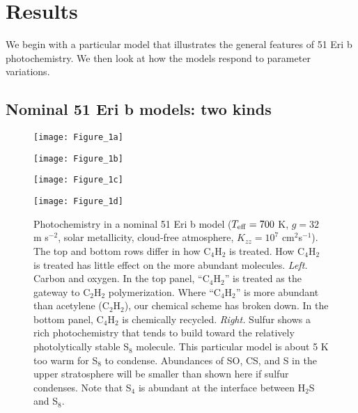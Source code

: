 \documentclass[preprint]{aastex}
\begin{document}
\section{Results}
\label{Results}

We begin with a particular model that illustrates the general features of 51 Eri b photochemistry.
We then look at how the models respond to parameter variations. 

\subsection{Nominal 51 Eri b models: two kinds}

\begin{figure}[!htb]
 \centering
 \begin{minipage}[c]{0.49\textwidth}
   \centering
  \texttt{[image: Figure\_1a]} 
 \end{minipage}
 \begin{minipage}[c]{0.49\textwidth}
   \centering
 \texttt{[image: Figure\_1b]} 
 \end{minipage}
 \centering
 \begin{minipage}[c]{0.49\textwidth}
   \centering
 \texttt{[image: Figure\_1c]} 
 \end{minipage}
 \begin{minipage}[c]{0.49\textwidth}
   \centering
 \texttt{[image: Figure\_1d]} 
 \end{minipage}
 \caption{\small Photochemistry in a nominal 51 Eri b model
  ($T_{\rm eff}=700$ K, $g=32$ m s$^{-2}$, solar metallicity, cloud-free atmosphere, $K_{zz}=10^7$ cm$^2$s$^{-1}$).
  The top and bottom rows differ in how C$_4$H$_2$ is treated. 
  How C$_4$H$_2$ is treated has little effect on the more abundant molecules. %
   {\it Left.} Carbon and oxygen.  In the top panel, ``C$_4$H$_2$'' is treated as the gateway to C$_2$H$_2$ polymerization.
     Where ``C$_4$H$_2$'' is more abundant than acetylene (C$_2$H$_2$), our chemical scheme has broken down.
  In the bottom panel, C$_4$H$_2$ is chemically recycled.     
  {\it Right.} Sulfur shows a rich photochemistry that tends to build toward the relatively photolytically stable S$_8$ molecule.
  This particular model is about 5 K too warm for S$_8$ to condense. 
   Abundances of SO, CS, and S in the upper stratosphere will be smaller
  than shown here if sulfur condenses.
  Note that S$_4$ is abundant at the interface between H$_2$S and S$_8$.  
  }
\label{T700K7}
\end{figure}
\end{document}
